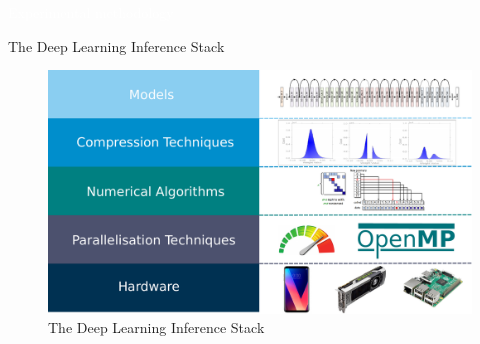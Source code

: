 \documentclass[xcolor=dvipsnames]{beamer}
\begin{document}
{
\begin{frame}
    \centering
    \textcolor{white}{\LARGE Experimental methodology}
\end{frame}
}

\begin{frame}{The Deep Learning Inference Stack}
\begin{figure}
    \centering
    \includegraphics[width=\linewidth]{images/inference-stack.pdf}
    \caption{The Deep Learning Inference Stack}
    \label{fig:inference-stack}
\end{figure}
\end{frame}
\end{document}
